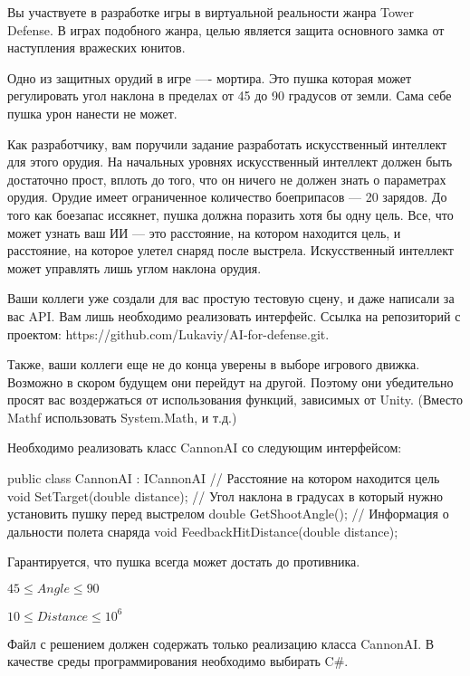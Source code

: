 
Вы участвуете в разработке игры в виртуальной реальности жанра Tower Defense. В играх подобного жанра, целью является защита основного замка от наступления вражеских юнитов.

Одно из защитных орудий в игре —- мортира. Это пушка которая может регулировать угол наклона в пределах от 45 до 90 градусов от земли. Сама себе пушка урон нанести не может.

Как разработчику, вам поручили задание разработать искусственный интеллект для этого орудия. На начальных уровнях искусственный интеллект должен быть достаточно прост, вплоть до того, что он ничего не должен знать о параметрах орудия. Орудие имеет ограниченное количество боеприпасов — 20 зарядов. До того как боезапас иссякнет, пушка должна поразить хотя бы одну цель. Все, что может узнать ваш ИИ — это расстояние, на котором находится цель, и расстояние, на которое улетел снаряд после выстрела. Искусственный интеллект может управлять лишь углом наклона орудия.

Ваши коллеги уже создали для вас простую тестовую сцену, и даже написали за вас API. Вам лишь необходимо реализовать интерфейс. Ссылка на репозиторий с проектом: https://github.com/Lukaviy/AI-for-defense.git.

Также, ваши коллеги еще не до конца уверены в выборе игрового движка. Возможно в скором будущем они перейдут на другой. Поэтому они убедительно просят вас воздержаться от использования функций, зависимых от Unity. (Вместо Mathf использовать System.Math, и т.д.)

Необходимо реализовать класс CannonAI со следующим интерфейсом:
     
        public class CannonAI : ICannonAI
        {
            // Расстояние на котором находится цель
            void SetTarget(double distance);
            // Угол наклона в градусах в который нужно установить пушку перед выстрелом
            double GetShootAngle();
            // Информация о дальности полета снаряда
            void FeedbackHitDistance(double distance);
        }


Гарантируется, что пушка всегда может достать до противника.

$45\leq Angle \leq 90$

$10\leq Distance \leq 10^6$
        
\outputfmtSection

Файл с решением должен содержать только реализацию класса CannonAI. В качестве среды программирования необходимо выбирать C\#.
